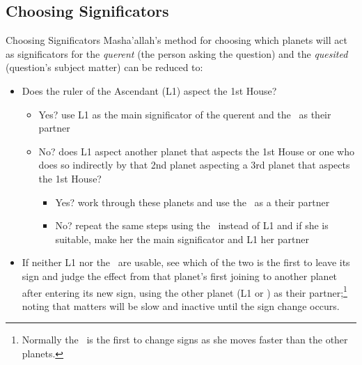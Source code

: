 \subsection{Choosing Significators}
\begin{frame}[t]{Choosing Significators}
Masha'allah's method for choosing which planets will act as significators for the \textsl{querent} (the person asking the question) and the \textsl{quesited} (question's subject matter) can be reduced to:
\begin{itemize}
\item Does the ruler of the Ascendant (L1) aspect the 1st House?
	\begin{itemize}
		\item Yes? use L1 as the main significator of the querent and the \Moon\ as their partner
		\item No? does L1 aspect another planet that aspects the 1st House or one who does so indirectly by that 2nd planet aspecting a 3rd planet that aspects the 1st House?
			\begin{itemize}
				\item Yes? work through these planets and use the \Moon\ as a their partner
				\item No? repeat the same steps using the \Moon\ instead of L1 and if she is suitable, make her the main significator and L1 her partner
			\end{itemize}
	\end{itemize}
\item If neither L1 nor the \Moon\ are usable, see which of the two is the first to leave its sign and judge the effect from that planet's first joining to another planet after entering its new sign, using the other planet (L1 or \Moon) as their partner;\footnote{Normally the \Moon\ is the first to change signs as she moves faster than the other planets.} noting that matters will be slow and inactive until the sign change occurs.
\end{itemize}

\end{frame}
